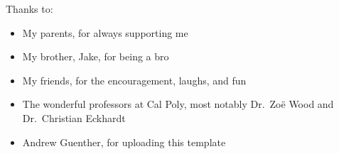\noindent
Thanks to:
\begin{itemize}
    \item My parents, for always supporting me
    \item My brother, Jake, for being a bro
    \item My friends, for the encouragement, laughs, and fun
    \item The wonderful professors at Cal Poly, most notably Dr.~Zo\"e Wood and Dr.~Christian Eckhardt
    \item Andrew Guenther, for uploading this template
\end{itemize}

